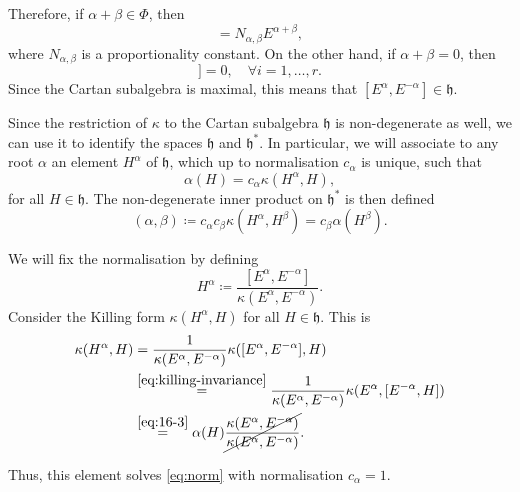 Therefore, if $\alpha + \beta \in \Phi$, then
 \begin{equation}
   [E^{\alpha}, E^{\beta}] = N_{\alpha, \beta} E^{\alpha + \beta},
\end{equation}
where $N_{\alpha, \beta}$ is a proportionality constant.
On the other hand, if $\alpha + \beta = 0$, then
 \begin{equation}
   [H^{i}, [E^{\alpha} , E^{-a}]]  =0,  \quad \forall i = 1, \dots, r.
\end{equation}
Since the Cartan subalgebra is maximal, this means that $[E^{\alpha} , E^{-\alpha}] \in \mathfrak{h}$.
\begin{leftbar}
  Since the restriction of $\kappa$ to the Cartan subalgebra $\mathfrak{h}$ is non-degenerate as well, we can use it to identify the spaces $\mathfrak{h}$ and $\mathfrak{h}^*$. In particular, we will associate to any root $\alpha$ an element $H^{\alpha}$ of $\mathfrak{h}$, which up to normalisation $c_{\alpha}$ is unique, such that
  \begin{equation}
    \label{eq:norm}
    \alpha(H) = c_{\alpha} \kappa(H^{\alpha}, H),
  \end{equation}
  for all $H \in \mathfrak{h}$.
  The non-degenerate inner product on $\mathfrak{h}^*$ is then defined
  \begin{equation}
    (\alpha, \beta) \coloneqq c_{\alpha} c_{\beta} \kappa(H^{\alpha}, H^{\beta}) = c_{\beta} \alpha(H^{\beta}).
  \end{equation}
\end{leftbar}
We will fix the normalisation by defining
\begin{equation}
  H^{\alpha} \coloneqq \frac{[E^{\alpha} , E^{-\alpha}]}{\kappa ( E^{\alpha} , E^{-\alpha})}.
\end{equation}
Consider the Killing form $\kappa(H^{\alpha} , H)$ for all $H \in \mathfrak{h}$. This is
\begin{align}
  \kappa(H^{\alpha} , H) &= \frac{1}{\kappa(E^{\alpha} , E^{-\alpha})} \kappa([E^{\alpha} , E^{-\alpha} ], H) \\
			 &\stackrel{\eqref{eq:killing-invariance}}{=} \frac{1}{\kappa(E^{\alpha}, E^{-\alpha})} \kappa (E^{\alpha}, [E^{-\alpha}, H]) \\
			 &\stackrel{\eqref{eq:16-3}}{=} \alpha(H) \cancel{\frac{\kappa(E^{\alpha}, E^{-\alpha})}{\kappa(E^{\alpha}, E^{-\alpha})}}. \label{eq:17-star}
\end{align}
\begin{leftbar}
  Thus, this element solves \eqref{eq:norm} with normalisation $c_{\alpha} = 1$.
\end{leftbar}

